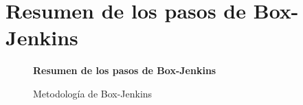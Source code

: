 \pagebreak\section{Resumen de los pasos de Box-Jenkins}

\begin{figure}[H]
	\centering
	\textbf{Resumen de los pasos de Box-Jenkins}\par\medskip
	\caption{Metodología de Box-Jenkins}\label{fig30}
\end{figure}

%


